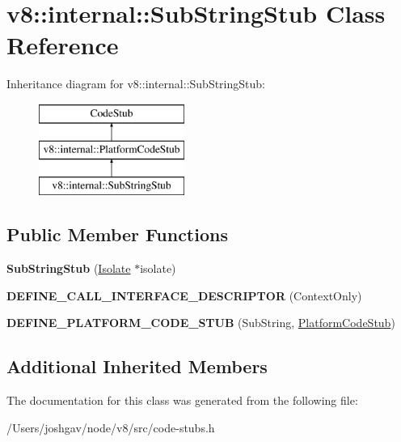 \hypertarget{classv8_1_1internal_1_1_sub_string_stub}{}\section{v8\+:\+:internal\+:\+:Sub\+String\+Stub Class Reference}
\label{classv8_1_1internal_1_1_sub_string_stub}
Inheritance diagram for v8\+:\+:internal\+:\+:Sub\+String\+Stub\+:\begin{figure}[H]
\begin{center}
\leavevmode
\includegraphics[height=3.000000cm]{classv8_1_1internal_1_1_sub_string_stub}
\end{center}
\end{figure}
\subsection*{Public Member Functions}
\begin{DoxyCompactItemize}
\item 
{\bfseries Sub\+String\+Stub} (\hyperlink{classv8_1_1internal_1_1_isolate}{Isolate} $\ast$isolate)\hypertarget{classv8_1_1internal_1_1_sub_string_stub_ae24428840f716666bf2fa8034baaadcb}{}\label{classv8_1_1internal_1_1_sub_string_stub_ae24428840f716666bf2fa8034baaadcb}

\item 
{\bfseries D\+E\+F\+I\+N\+E\+\_\+\+C\+A\+L\+L\+\_\+\+I\+N\+T\+E\+R\+F\+A\+C\+E\+\_\+\+D\+E\+S\+C\+R\+I\+P\+T\+OR} (Context\+Only)\hypertarget{classv8_1_1internal_1_1_sub_string_stub_a0f0e07520089b21edc011e71c613e45e}{}\label{classv8_1_1internal_1_1_sub_string_stub_a0f0e07520089b21edc011e71c613e45e}

\item 
{\bfseries D\+E\+F\+I\+N\+E\+\_\+\+P\+L\+A\+T\+F\+O\+R\+M\+\_\+\+C\+O\+D\+E\+\_\+\+S\+T\+UB} (Sub\+String, \hyperlink{classv8_1_1internal_1_1_platform_code_stub}{Platform\+Code\+Stub})\hypertarget{classv8_1_1internal_1_1_sub_string_stub_a325349088929a1a14f7a0ef388e73ad9}{}\label{classv8_1_1internal_1_1_sub_string_stub_a325349088929a1a14f7a0ef388e73ad9}

\end{DoxyCompactItemize}
\subsection*{Additional Inherited Members}


The documentation for this class was generated from the following file\+:\begin{DoxyCompactItemize}
\item 
/\+Users/joshgav/node/v8/src/code-\/stubs.\+h\end{DoxyCompactItemize}
